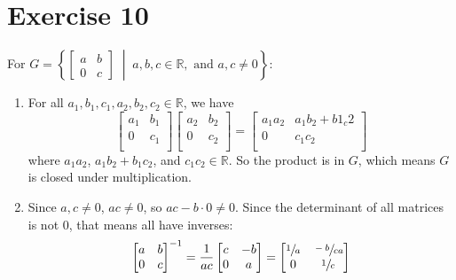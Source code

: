 \documentclass{article}
\newcommand{\R}{\mathbb{R}}
\begin{document}
    \section*{Exercise 10}
    For $G = \left\{ \begin{bmatrix} a & b \\ 0 & c \end{bmatrix} \;
    \middle\vert \; a, b, c \in \R, \text{ and } a, c \neq 0 \right\}$:
    \begin{enumerate}[label=\textbf{\alph*.}]
        \item 
            For all $a_1, b_1, c_1, a_2, b_2, c_2 \in \R$, we have
            \[ \begin{bmatrix}
            a_1 & b_1 \\
            0 & c_1 \\
            \end{bmatrix}
            \begin{bmatrix}
            a_2 & b_2 \\
            0 & c_2 \\
            \end{bmatrix}
            = \begin{bmatrix}
            a_1a_2 & a_1b_2 + b1_c2 \\
            0 & c_1c_2 \\
            \end{bmatrix} \]
            where $a_1a_2$, $a_1b_2 + b_1c_2$, and $c_1c_2 \in \R$.
            So the product is in $G$,
            which means $G$ is closed under multiplication.
        \item
            Since $a, c \neq 0$, $ac \neq 0$,
            so $ac - b \cdot 0 \neq 0$.
            Since the determinant of all matrices is not 0, that means all
            have inverses:
            \[ \begin{bmatrix}
            a & b \\
            0 & c \\
            \end{bmatrix}^{-1}
            = \dfrac{1}{ac}\begin{bmatrix}
            c & -b \\
            0 & a \\
            \end{bmatrix}
            = \begin{bmatrix}
            \sfrac{1}{a} & \sfrac{-b}{ca} \\
            0 & \sfrac{1}{c} \\

\end{bmatrix}\]
\end{enumerate}
\end{document}
